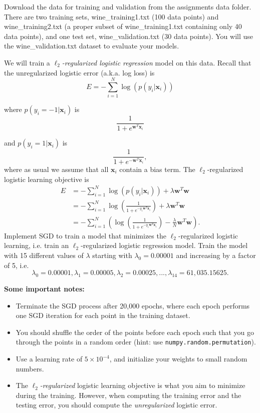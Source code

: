 Download the data for training and validation from the assignments data folder.
There are two training sets,
wine\_training1.txt (100 data points) and wine\_training2.txt (a proper subset of wine\_training1.txt containing only 40 data points), and one test set, wine\_validation.txt (30 data points). You will use the wine\_validation.txt dataset to evaluate your models.

We will train a \emph{$\ell_2$-regularized logistic regression} model on this data. Recall that the unregularized logistic error (a.k.a. log loss) is
\[E = -\sum_{i=1}^{N}\log(p(y_i | \mathbf{x}_i))\]

where $p(y_i = -1 | \mathbf{x}_i)$ is
\[\frac{1}{1 + e^{\mathbf{w}^T\mathbf{x}_i}}\]

and $p(y_i = 1 | \mathbf{x}_i)$ is
\[\frac{1}{1 + e^{-\mathbf{w}^T\mathbf{x}_i}},\]
where as usual we assume that all $\mathbf{x}_i$ contain a bias term.
The $\ell_2$-regularized logistic learning objective is 
\begin{align*}
  E &= -\sum_{i=1}^{N}\log(p(y_i | \mathbf{x}_i)) + \lambda\mathbf{w}^T\mathbf{w} \\
    &= -\sum_{i=1}^{N} \log \left( \frac{1}{1 + e^{-y_i\mathbf{w}^T\mathbf{x}_i}} \right) + \lambda\mathbf{w}^T\mathbf{w} \\
    &= -\sum_{i=1}^{N} \left(\log \left( \frac{1}{1 + e^{-y_i\mathbf{w}^T\mathbf{x}_i}} \right) - \frac{\lambda}{N}\mathbf{w}^T\mathbf{w}\right).
\end{align*}
Implement SGD to train a model that minimizes the $\ell_2$-regularized logistic learning, i.e. train an $\ell_2$-regularized logistic regression model.  Train the model with 15 different values of $\lambda$ starting with $\lambda_0 = 0.00001$ and increasing by a factor of 5, i.e. $$\lambda_0 = 0.00001, \lambda_1 = 0.00005, \lambda_2 = 0.00025, ..., \lambda_{14} = 61,035.15625.$$
\par

\textbf{Some important notes:} 
\begin{itemize}
    \item Terminate the SGD process after 20,000 epochs, where each epoch performs one SGD iteration for each point in the training dataset.
    \item You should shuffle the order of the points before each epoch such that you go through the points in a random order (hint: use \texttt{numpy.random.permutation}).
    \item Use a learning rate of $5 \times 10^{-4}$, and initialize your weights to small random numbers. 
    \item The \textit{$\ell_2$-regularized} logistic learning objective is what you aim to minimize during the training. However, when computing the training error and the testing error, you should compute the \textit{unregularized} logistic error. 
\end{itemize}


